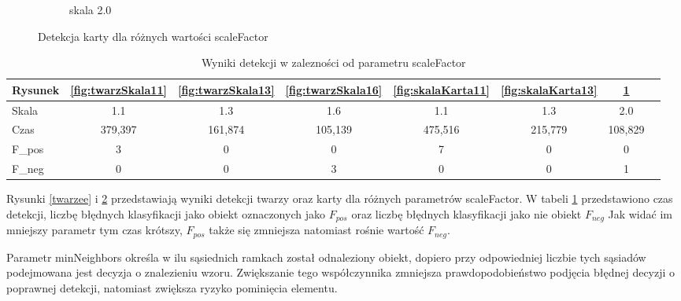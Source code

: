 \documentclass{article}
\numberwithin{equation}{section}
\begin{document}
\begin{figure}[H]
\begin{subfigure}{0.32\textwidth}
        \caption{skala 2.0}
        \label{fig:skalaKarta20}
    \end{subfigure}
    \caption{Detekcja karty dla różnych wartości scaleFactor}
    \label{kartyy}
\end{figure}

\begin{table}[H]
    \caption{Wyniki detekcji w zalezności od parametru scaleFactor}
    \label{tab:skale}
    \begin{tabular}{|l|c|c|c|c|c|c|c|}
\hline
Rysunek & \ref{fig:twarzSkala11} & \ref{fig:twarzSkala13} & \ref{fig:twarzSkala16} & \ref{fig:skalaKarta11} & \ref{fig:skalaKarta13} & \ref{fig:skalaKarta20}\\
\hline
Skala & 1.1 & 1.3 & 1.6 & 1.1 & 1.3 & 2.0\\
\hline
Czas & 379,397 & 161,874 & 105,139 & 475,516 & 215,779 & 108,829\\
\hline
F_{pos} & 3 & 0 & 0 & 7 & 0 & 0\\
\hline
F_{neg} & 0 & 0 & 3 & 0 & 0 & 1\\
\hline
\end{tabular}
\end{table}

Rysunki \ref{twarzee} i \ref{kartyy} przedstawiają wyniki detekcji twarzy oraz karty dla różnych parametrów scaleFactor. W tabeli \ref{tab:skale} przedstawiono czas detekcji, liczbę błędnych klasyfikacji jako obiekt oznaczonych jako ${F_{pos}}$ oraz liczbę błędnych klasyfikacji jako nie obiekt ${F_{neg}}$ Jak widać im mniejszy parametr tym czas krótszy, ${F_{pos}}$ także się zmniejsza natomiast rośnie wartość ${F_{neg}}$.

Parametr minNeighbors określa w ilu sąsiednich ramkach został odnaleziony obiekt, dopiero przy odpowiedniej liczbie tych sąsiadów podejmowana jest decyzja o znalezieniu wzoru. Zwiększanie tego współczynnika zmniejsza prawdopodobieństwo podjęcia błędnej decyzji o poprawnej detekcji, natomiast zwiększa ryzyko pominięcia elementu.
\end{document}
